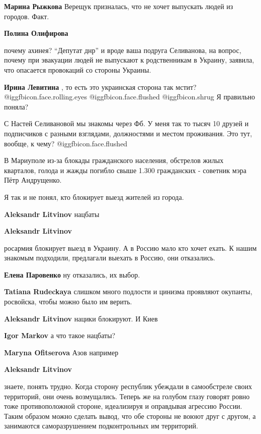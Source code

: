 \begin{itemize}
\begin{itemize}
\textbf{Марина Рыжкова} Верещук призналась, что не хочет выпускать людей из городов. Факт.

\textbf{Полина Олифирова} 

почему ахинея? \enquote{Депутат днр} и вроде ваша подруга Селиванова, на
вопрос, почему при эвакуации людей не выпускают к родственникам в Украину,
заявила, что опасается провокаций со стороны Украины.

\textbf{Ирина Левитина} , то есть это украинская сторона так мстит?  @igg{fbicon.face.rolling.eyes}  @igg{fbicon.face.flushed}  @igg{fbicon.shrug}  Я правильно поняла?

С Настей Селивановой мы знакомы через Фб. У меня так то тысяч 10 друзей и
подписчиков с разными взглядами, должностями и местом проживания. Это тут,
вообще, к чему?  @igg{fbicon.face.flushed} 

\end{itemize} %


В Мариуполе из-за блокады гражданского населения, обстрелов жилых кварталов,
голода и жажды погибло свыше 1.300 гражданских - советник мэра Пётр Андрущенко.

Я так и не понял, кто блокирует выезд жителей из города.

\begin{itemize} %
\textbf{Aleksandr Litvinov} нацбаты

\textbf{Aleksandr Litvinov} 

росармия блокирует выезд в Украину. А в Россию мало кто хочет ехать. К нашим
знакомым подходили, предлагали выехать в Россию, они отказались.

\textbf{Елена Паровенко} ну отказались, их выбор.

\textbf{Tatiana Rudeckaya} слишком много подлости и цинизма проявляют окупанты, росвойска, чтобы можно было им верить.

\textbf{Aleksandr Litvinov} нацики блокируют. И Киев

\textbf{Igor Markov} а что такое нацбаты?

\textbf{Maryna Ofitserova} Азов например

\textbf{Aleksandr Litvinov} 

знаете, понять трудно. Когда сторону республик убеждали в самообстреле своих
территорий, они очень возмущались. Теперь же на голубом глазу говорят ровно
тоже противоположной стороне, идеализируя и оправдывая агрессию России. Таким
образом можно сделать вывод, что обе стороны не воюют друг с другом, а
занимаются саморазрушением подконтрольных им территорий.


\end{itemize}
\end{itemize}
